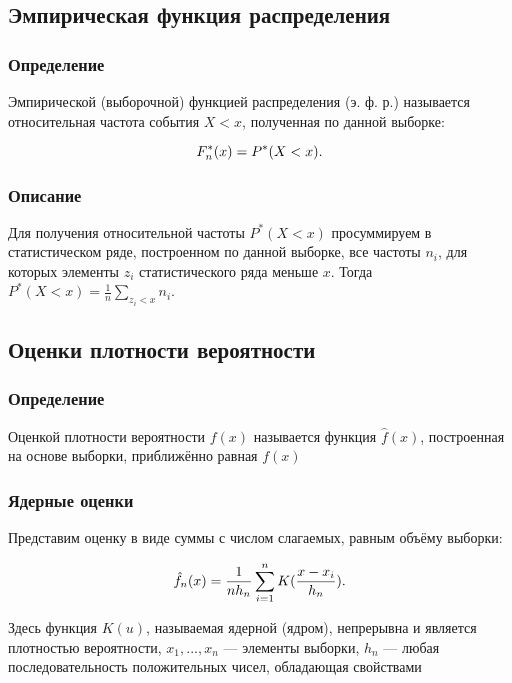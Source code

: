 \documentclass[12pt,a4paper]{scrartcl}
\begin{document}
\subsection{Эмпирическая функция распределения}
\subsubsection{Определение}

Эмпирической (выборочной) функцией распределения (э. ф. р.) называется
относительная частота события $X < x$, полученная по данной выборке:

\begin{equation}\label{eq:EmpDistr}
\centering
F_n^*(x) = P^*(X < x).
\end{equation}

\subsubsection{Описание}

Для получения относительной частоты $P^*(X < x)$ просуммируем в статистическом ряде, построенном по данной выборке, все частоты $n_i$, для которых элементы $z_i$ статистического ряда меньше $x$. Тогда $P^*(X < x) = \frac{1}{n}\sum_{z_i < x} n_i.$

\subsection{Оценки плотности вероятности}
\subsubsection{Определение}

Оценкой плотности вероятности $f(x)$ называется функция $\hat{f}(x)$, построенная на основе выборки, приближённо равная $f(x)$

\subsubsection{Ядерные оценки}

Представим оценку в виде суммы с числом слагаемых, равным объёму выборки:

\begin{equation}\label{eq:KernelEstimate}
\centering
\hat{f}_n(x) = \frac{1}{nh_n}\sum_{i=1}^n K(\frac{x-x_i}{h_n}).
\end{equation}

Здесь функция $K(u)$, называемая ядерной (ядром), непрерывна и является
плотностью вероятности, $x_1, ... , x_n$ — элементы выборки, {$h_n$} — любая
последовательность положительных чисел, обладающая свойствами
\end{document}

